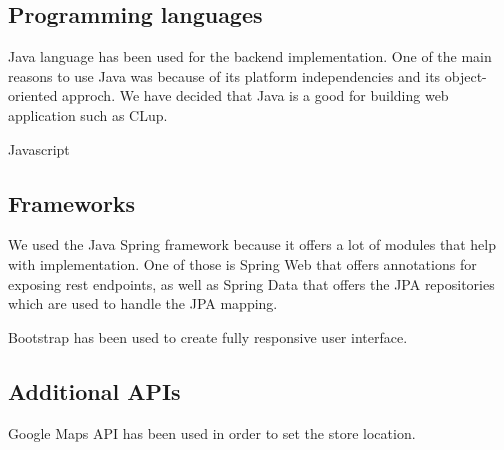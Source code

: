 \subsection{Programming languages}

Java language has been used for the backend implementation.
One of the main reasons to use Java was because of its platform independencies and its object-oriented approch.
We have decided that Java is a good for building web application such as CLup.

Javascript
\subsection{Frameworks}

We used the Java Spring framework because it offers a lot of modules that help with implementation.
One of those is Spring Web that offers annotations for exposing rest endpoints, as well as Spring Data
that offers the JPA repositories which are used to handle the JPA mapping.

Bootstrap has been used to create fully responsive user interface.

\subsection{Additional APIs}

Google Maps API has been used in order to set the store location.
